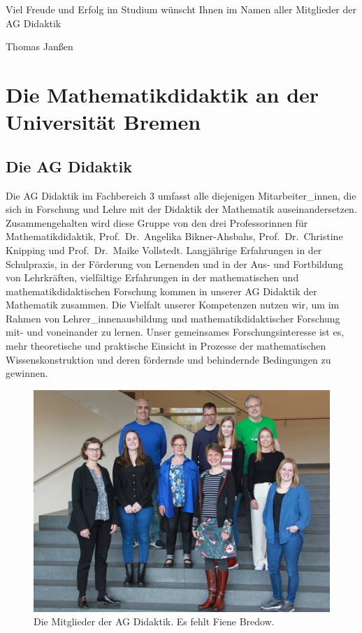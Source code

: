 \documentclass[ngerman,oneside,12pt,a4paper]{scrbook}
\begin{document}
Viel Freude und Erfolg im Studium wünscht Ihnen im Namen aller
Mitglieder der AG Didaktik

Thomas Janßen

\chapter{Die Mathematikdidaktik an der Universität
Bremen}\label{die-mathematikdidaktik-an-der-universitat-bremen}

\section{Die AG Didaktik}\label{die-ag-didaktik}

Die AG Didaktik im Fachbereich 3 umfasst alle diejenigen
Mitarbeiter\_innen, die sich in Forschung und Lehre mit der Didaktik der
Mathematik auseinandersetzen. Zusammengehalten wird diese Gruppe von den
drei Professorinnen für Mathematikdidaktik, Prof.~Dr.~Angelika
Bikner-Ahsbahs, Prof.~Dr.~Christine Knipping und Prof.~Dr.~Maike
Vollstedt. Langjährige Erfahrungen in der Schulpraxis, in der Förderung
von Lernenden und in der Aus- und Fortbildung von Lehrkräften,
vielfältige Erfahrungen in der mathematischen und mathematikdidaktischen
Forschung kommen in unserer AG Didaktik der Mathematik zusammen. Die
Vielfalt unserer Kompetenzen nutzen wir, um im Rahmen von
Lehrer\_innenausbildung und mathematikdidaktischer Forschung mit- und
voneinander zu lernen. Unser gemeinsames Forschungsinteresse ist es,
mehr theoretische und praktische Einsicht in Prozesse der mathematischen
Wissenskonstruktion und deren fördernde und behindernde Bedingungen zu
gewinnen.

\begin{figure}
\centering
\includegraphics{bild_ag.jpg}
\caption{\label{fig:ID}Die Mitglieder der AG Didaktik. Es fehlt Fiene
Bredow.}
\end{figure}
\end{document}
